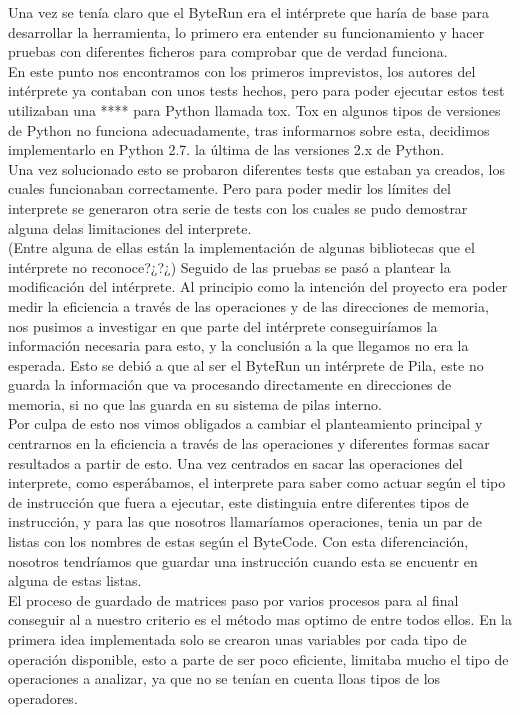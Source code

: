 	
Una vez se tenía claro que el ByteRun era el intérprete que haría de base para desarrollar la herramienta, lo primero era entender su funcionamiento y hacer pruebas con diferentes ficheros para comprobar que de verdad funciona.\\
En este punto nos encontramos con los primeros imprevistos, los autores del intérprete ya contaban con unos tests hechos, pero para poder ejecutar estos test utilizaban una **** para Python llamada tox. Tox en algunos tipos de versiones de Python no funciona adecuadamente, tras informarnos sobre esta, decidimos implementarlo en Python 2.7. la última de las versiones 2.x de Python.\\
Una vez solucionado esto se probaron diferentes tests que estaban ya creados, los cuales funcionaban correctamente. Pero para poder medir los límites del interprete se generaron otra serie de tests con los cuales se pudo demostrar alguna delas limitaciones del interprete.\\
(Entre alguna de ellas están la implementación de algunas bibliotecas que el intérprete no reconoce?¿?¿)
Seguido de las pruebas se pasó a plantear la modificación del intérprete. Al principio como la intención del proyecto era poder medir la eficiencia a través de las operaciones y de las direcciones de memoria, nos pusimos a investigar en que parte del intérprete conseguiríamos la información necesaria para esto, y la conclusión a la que llegamos no era la esperada. Esto se debió a que al ser el ByteRun un intérprete de Pila, este no guarda la información que va procesando directamente en direcciones de memoria, si no que las guarda en su sistema de pilas interno. \\
Por culpa de esto nos vimos obligados a cambiar el planteamiento principal y centrarnos en la eficiencia a través de las operaciones y diferentes formas sacar resultados a partir de esto.
Una vez centrados en sacar las operaciones del interprete, como esperábamos, el interprete para saber como actuar según el tipo de instrucción que fuera a ejecutar, este distinguia entre diferentes tipos de instrucción, y para las que nosotros llamaríamos operaciones, tenia un par de listas con los nombres de estas según el ByteCode. Con esta diferenciación, nosotros tendríamos que guardar una instrucción cuando esta se encuentr en alguna de estas listas. \\
El proceso de guardado de matrices paso por varios procesos para al final conseguir al a nuestro criterio es el método mas optimo de entre todos ellos.
En la primera idea implementada solo se crearon unas variables por cada tipo de operación disponible, esto a parte de ser poco eficiente, limitaba mucho el tipo de operaciones a analizar, ya que no se tenían en cuenta lloas tipos de los operadores.\\
